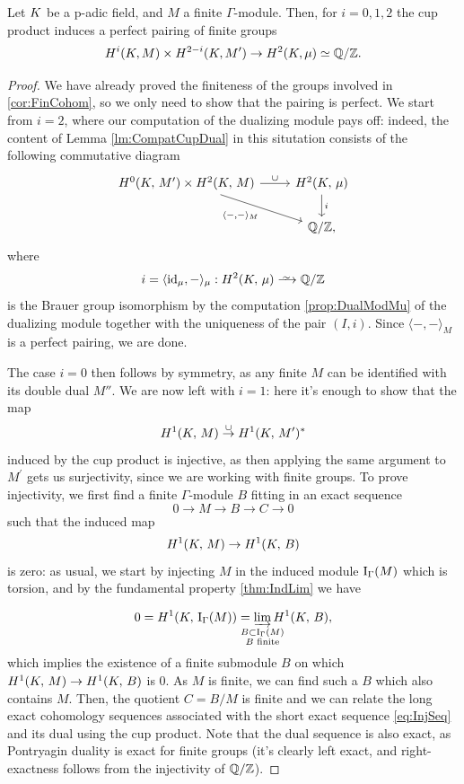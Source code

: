 \documentclass[a4paper, oneside]{memoir}
\begin{document}
\begin{theorem}
	Let $K$ be a p-adic field, and $M$ a finite $\Gamma$-module.
	Then, for $i=0,1,2$ the cup product induces a perfect pairing of finite groups
	\begin{equation*}
		H^i(K, M) \times H^{2-i}(K, M^{\prime}) \to H^2(K, \mu)\simeq \mathbb{Q}/\mathbb{Z}.
	\end{equation*}
\end{theorem}
\begin{proof}
	We have already proved the finiteness of the groups involved in \ref{cor:FinCohom}, so we only need to show that the pairing is perfect.
	We start from $i=2$, where our computation of the dualizing module pays off: indeed, the content of Lemma \ref{lm:CompatCupDual}
	in this situtation consists of the following commutative diagram
	\begin{equation*}
		\begin{tikzcd}
			{\H{0}{\K}{M^\prime}  \times \HH{\K}{M}} \ar[swap, rd, "\langle - {,} - \rangle_M "] \ar[r, "\cup"] & \HH{\K}{\mu} \ar[d, "i"] \\
			& \Q/\Z,
		\end{tikzcd}
	\end{equation*}
	where
	\[
		i = \langle \id_{\mu}, - \rangle_\mu : \H{2}{\K}{\mu} \Iso \Q/\Z
	\]
	is the Brauer group isomorphism by the computation \ref{prop:DualModMu} of the dualizing module together with the uniqueness of the pair $(I,i)$.
	Since \(\langle -{,}- \rangle_M\) is a perfect pairing, we are done.

	The case $i=0$ then follows by symmetry, as any finite $M$ can be identified with its double dual $M''$.
	We are now left with $i=1$: here it's enough to show that the map
	\[
		H^{1}( K, \, M ) \overset{\cup}{\to} H^{1}( K, \, M^\prime )^*
	\]
	induced by the cup product is injective, as then applying the same argument to $M^\prime$ gets us surjectivity, since we are working with finite groups.
	To prove injectivity, we first find a finite $\Gamma$-module $B$ fitting in an exact sequence
	\begin{equation}\label{eq:InjSeq}
		0\to M\to B\to C\to 0
	\end{equation}
	such that the induced map
	\[
		H^{1}( K, \, M )\to H^{1}( K, \, B )
	\]
	is zero:
	as usual, we start by injecting $M$ in the induced module $\operatorname{I}_{\Gamma}(M)$ which is torsion, and by the fundamental property \ref{thm:IndLim} we have

	\[
		0=\H{1}{\K}{\Ind{\Gamma}{M}}=\varinjlim_{\mathclap{\substack{B\subset\Ind{\Gamma}{M} \\B\text{ finite}}}}{\H{1}{\K}{B}},
	\]
	which implies the existence of a finite submodule \(B\) on which \(H^{1}( K, \, M )\to H^{1}( K, \, B )\) is \(0\). As \(M\) is finite, we can find such a \(B\) which also contains \(M\). Then, the quotient \(C=B/M\) is finite and we can relate the long exact cohomology sequences associated with the short exact sequence \eqref{eq:InjSeq}
	and its dual using the cup product. Note that the dual sequence is also exact, as Pontryagin duality is exact for finite groups (it's clearly left exact, and right-exactness follows from the injectivity of $\mathbb{Q}/\mathbb{Z}$).


\end{proof}
\end{document}
